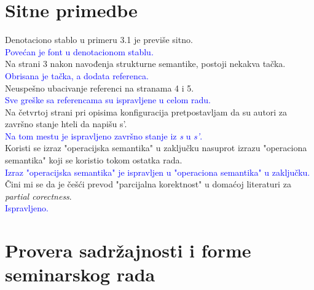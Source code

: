 \documentclass[a4paper]{report}
\newcommand{\odgovor}[1]{\textcolor{blue}{#1}}
\begin{document}
\section{Sitne primedbe}
Denotaciono stablo u primeru 3.1 je previše sitno.\\
\odgovor{Povećan je font u denotacionom stablu.}\\
Na strani 3 nakon navođenja strukturne semantike, postoji nekakva tačka.\\
\odgovor{Obrisana je tačka, a dodata referenca.}\\
Neuspešno ubacivanje referenci na stranama 4 i 5.\\
\odgovor{Sve greške sa referencama su ispravljene u celom radu.}\\
Na četvrtoj strani pri opisima konfiguracija pretpostavljam da su autori za završno stanje hteli da napišu s'.\\
\odgovor{Na tom mestu je ispravljeno završno stanje iz \textit{s} u \textit{s'}.}\\
Koristi se izraz "operacijska semantika" u zaključku nasuprot izrazu "operaciona semantika"  koji se koristio tokom ostatka rada. \\
\odgovor{Izraz "operacijska semantika" je ispravljen u "operaciona semantika" u zaključku.}\\
Čini mi se da je češći prevod "parcijalna korektnost" u domaćoj literaturi za {\em partial corectness}. \\
\odgovor{Ispravljeno.}\\
\section{Provera sadržajnosti i forme seminarskog rada}
\end{document}
